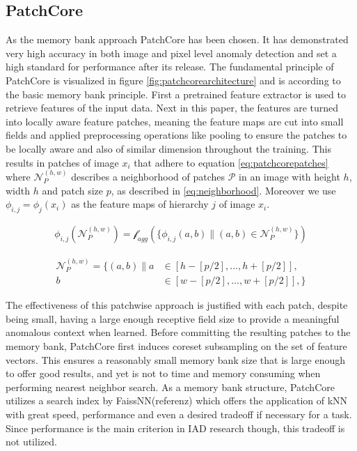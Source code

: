 \subsection{PatchCore}
\label{subsec:patchcore}
As the memory bank approach PatchCore \cite{patchCore2022} has been chosen. It has demonstrated very high accuracy in both image and pixel level anomaly detection and set a high standard for 
performance after its release. The fundamental principle of PatchCore is visualized in figure \ref{fig:patchcorearchitecture} and is according to the basic memory bank principle. First a pretrained feature extractor is used 
to retrieve features of the input data. Next in this paper, the features are turned into locally aware feature patches, meaning the feature maps are cut into small fields and applied preprocessing operations like pooling to ensure 
the patches to be locally aware and also of similar dimension throughout the training. This results in patches of image $x_i$ that adhere to equation \ref{eq:patchcorepatches} where $\mathcal{N}_{P}^{(h,w)}$ 
describes a neighborhood of patches $\mathcal{P}$ in an image with height $h$, width $h$ and patch size $p$, as described in \ref{eq:neighborhood}. Moreover we use $\phi_{i,j} = \phi_j(x_i)$ as the feature 
maps of hierarchy $j$ of image $x_i$.

\begin{equation}
    \label{eq:patchcorepatches}
    \begin{split}
    \phi_{i,j} (\mathcal{N}_{P}^{(h,w)}) = \mathcal{f}_{agg}(\{ \phi_{i,j}(a,b) \| (a,b) \in \mathcal{N}_{P}^{(h,w)} \})
    \end{split}
\end{equation}

\begin{equation}
    \label{eq:neighborhood}
    \begin{split}
    \mathcal{N}_{P}^{(h,w)} = \{ (a,b) \| a & \in [h - [p/2], ..., h + [p/2]], \\
                                              b & \in [w - [p/2], ..., w + [p/2]], \}
    \end{split}
\end{equation}

The effectiveness of this patchwise approach is justified with each patch, despite being small, having a large enough receptive field size to provide a meaningful anomalous context when learned. 
Before committing the resulting patches to the memory bank, PatchCore first induces coreset subsampling on the set of feature vectors. This ensures a reasonably small memory bank size that is 
large enough to offer good results, and yet is not to time and memory consuming when performing nearest neighbor search. As a memory bank structure, PatchCore utilizes a search index by FaissNN(referenz) 
which offers the application of kNN with great speed, performance and even a desired tradeoff if necessary for a task. Since performance is the main criterion in IAD research though, this tradeoff is not 
utilized. 

